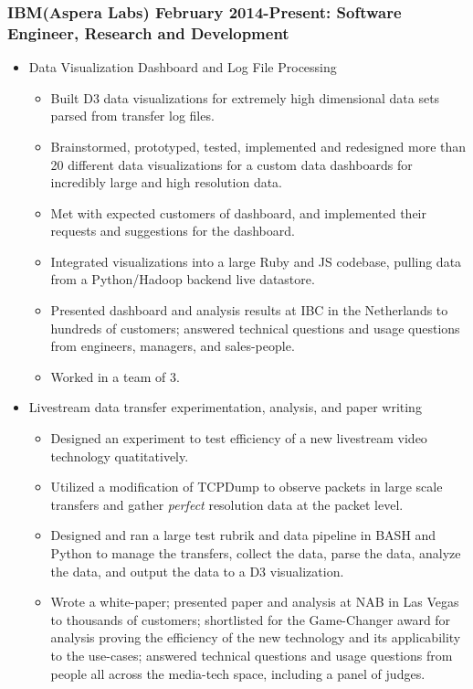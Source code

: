 \documentclass[a4paper,10pt,notitlepage]{article}
\begin{document}
\subsubsection*{IBM(Aspera Labs) February 2014-Present: Software Engineer, Research and Development}
	\begin{itemize}
	\vspace{-5pt}\item 	Data Visualization Dashboard and Log File Processing \begin{itemize}
					\item 	Built D3 data visualizations for extremely high dimensional data sets parsed from transfer log files. 
					\item 	Brainstormed, prototyped, tested, implemented and redesigned more than 20 different data visualizations for a custom data dashboards for incredibly large and high resolution data. 
					\item 	Met with expected customers of dashboard, and implemented their requests and suggestions for the dashboard. 
					\item 	Integrated visualizations into a large Ruby and JS codebase, pulling data from a Python/Hadoop backend live datastore. 
					\item 	Presented dashboard and analysis results at IBC in the Netherlands to hundreds of customers; answered technical questions and usage questions from engineers, managers, and sales-people. 
					\item 	Worked in a team of 3.
					\end{itemize}
	\vspace{-5pt}\item 	Livestream data transfer experimentation, analysis, and paper writing \begin{itemize}
					\item 	Designed an experiment to test efficiency of a new livestream video technology quatitatively. 
					\item 	Utilized a modification of TCPDump to observe packets in large scale transfers and gather \textit{perfect} resolution data at the packet level. 
					\item 	Designed and ran a large test rubrik and data pipeline in BASH and Python to manage the transfers, collect the data, parse the data, analyze the data, and output the data to a D3 visualization. 
					\item 	Wrote a white-paper; presented paper and analysis at NAB in Las Vegas to thousands of customers; shortlisted for the Game-Changer award for analysis proving the efficiency of the new technology and its applicability to the use-cases; answered technical questions and usage questions from people all across the media-tech space, including a panel of judges. 		

\end{itemize}
\end{itemize}
\end{document}
